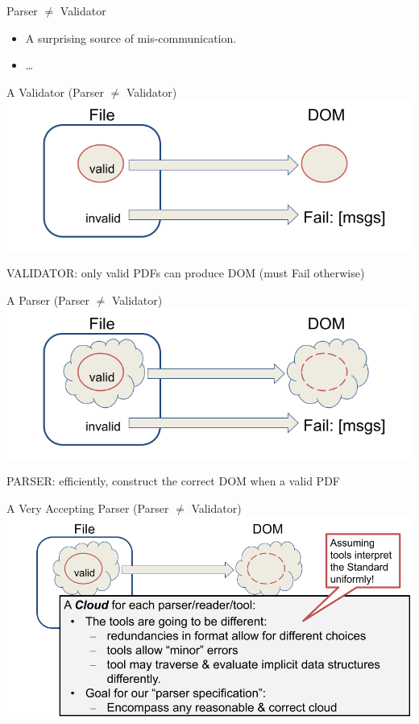 \documentclass[t,10pt,xcolor={dvipsnames}]{beamer}
\begin{document}
\begin{frame}[label={sec:orga20a984}]{Parser \(\neq\) Validator}
\begin{itemize}
\item A surprising source of mis-communication.
\item \ldots{}
\end{itemize}
\end{frame}
\begin{frame}[label={sec:org48df86c}]{A Validator (Parser \(\neq\) Validator)}
\vspace{10pt}
\includegraphics[width=0.80\linewidth]{images/pNEQv-1.png}
\vfill

VALIDATOR: only valid PDFs can produce DOM (must Fail otherwise)
\end{frame}

\begin{frame}[label={sec:orgeb6e62b}]{A Parser (Parser \(\neq\) Validator)}
\vspace{10pt}
\includegraphics[width=0.80\linewidth]{images/pNEQv-2.png}
\vfill

PARSER: efficiently, construct the correct DOM when a valid PDF
\end{frame}

\begin{frame}[label={sec:org762384e}]{A Very Accepting Parser (Parser \(\neq\) Validator)}
\vspace{10pt}
\includegraphics[width=0.95\linewidth]{images/pNEQv-3.png}
\end{frame}
\end{document}
